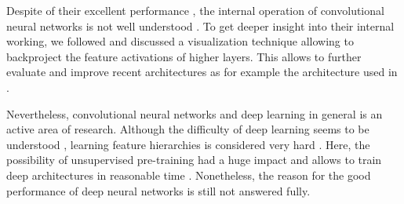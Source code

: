 Despite of their excellent performance \cite{KrizhevskySutskeverHinton:2012, CiresanMeierSchmidhuber:2012}, the internal operation of convolutional neural networks is not well understood \cite{ZeilerFergus:2013}. To get deeper insight into their internal working, we followed \cite{ZeilerFergus:2013} and discussed a visualization technique allowing to backproject the feature activations of higher layers. This allows to further evaluate and improve recent architectures as for example the architecture used in \cite{KrizhevskySutskeverHinton:2012}.

Nevertheless, convolutional neural networks and deep learning in general is an active area of research. Although the difficulty of deep learning seems to be understood \cite{Bengio:2009,GlorotBengio:2010,ErhanManzagolBengioVincent:2009}, learning feature hierarchies is considered very hard \cite{Bengio:2009}. Here, the possibility of unsupervised pre-training had a huge impact and allows to train deep architectures in reasonable time \cite{Bengio:2009,ErhanBengioCourvilleManzagolVincentBengio:2010}. Nonetheless, the reason for the good performance of deep neural networks is still not answered fully.





